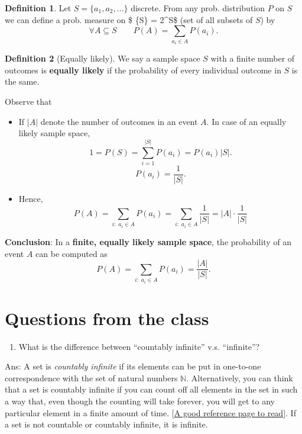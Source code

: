 \documentclass[
]{book}
\providecommand{\tightlist}{%
  \setlength{\itemsep}{0pt}\setlength{\parskip}{0pt}}
\theoremstyle{definition}
\newtheorem{definition}{Definition}[chapter]
\theoremstyle{definition}
\theoremstyle{definition}
\theoremstyle{definition}
\theoremstyle{remark}
\begin{document}
\begin{definition}
Let \(S=\{a_1,a_2,\dots\}\) discrete. From any prob. distribution \(P\) on \(S\) we can define a prob. measure on \$ \{\mathcal S\} = 2\^{}S\$ (set of all subsets of \(S\)) by
\[\forall A \subseteq S \qquad P(A)=\sum_{a_i\in A}P(a_i).\]
\end{definition}

\begin{definition}[Equally likely]
We say a sample space \(S\) with a finite number of outcomes is \textbf{equally likely} if the probability of every individual outcome in \(S\) is the same.
\end{definition}

Observe that

\begin{itemize}
\item
  If \(|A|\) denote the number of outcomes in an event \(A\). In case of an equally likely sample space,
  \[
  1=P(S)=\sum_{i=1}^{|S|}P(a_{i})= P(a_i)|S|.
  \]
  \[
  P(a_i)=\frac{1}{|S|}.
  \]
\item
  Hence,
  \[P(A) = \sum_{i:\;a_i \in A} P(a_i) = \sum_{i:\;a_i \in A} \frac{1}{|S|} =|A|\cdot  \frac{1}{|S|}\]
\end{itemize}

\textbf{Conclusion}: In a \textbf{finite, equally likely sample space}, the probability of an event \(A\) can be computed as
\[
P(A) = \sum_{i:\;a_i \in A} P(a_i) = \frac{|A|}{|S|}.
\]

\hypertarget{questions-from-the-class}{%
\section{Questions from the class}\label{questions-from-the-class}}

\begin{enumerate}
\def\labelenumi{\arabic{enumi}.}
\tightlist
\item
  What is the difference between ``countably infinite'' v.s. ``infinite''?
\end{enumerate}

Ans: A set is \emph{countably infinite} if its elements can be put in one-to-one correspondence with the set of natural numbers \(\mathbb{N}\). Alternatively, you can think that a set is countably infinite if you can count off all elements in the set in such a way that, even though the counting will take forever, you will get to any particular element in a finite amount of time. {[}\href{https://mathinsight.org/definition/countably_infinite}{A good reference page to read}{]}. If a set is not countable or countably infinite, it is infinite.
\end{document}
